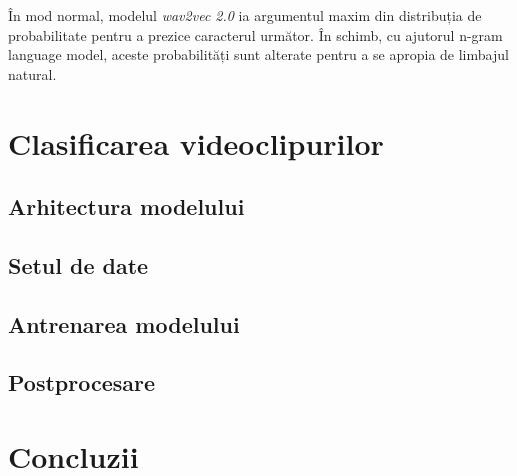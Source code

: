 \par
În mod normal, modelul \textit{wav2vec 2.0} ia argumentul maxim din distribuția de probabilitate
pentru a prezice caracterul următor. În schimb, cu ajutorul n-gram language model, aceste
probabilități sunt alterate pentru a se apropia de limbajul natural. 

\section{Clasificarea videoclipurilor}

\subsection{Arhitectura modelului}

\subsection{Setul de date}

\subsection{Antrenarea modelului}

\subsection{Postprocesare}

\section{Concluzii}
